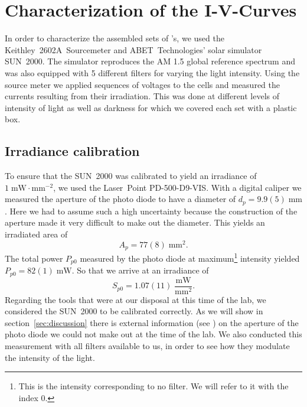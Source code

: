 
\section{Characterization of the I-V-Curves}\label{sec:charac}

In order to characterize the assembled sets of \BHSC's, we used the Keithley~2602A~Sourcemeter and ABET~Technologies’ solar simulator SUN~2000. The simulator reproduces the AM 1.5 global reference spectrum and was also equipped with 5 different filters for varying the light intensity. Using the source meter we applied sequences of voltages to the cells and measured the currents resulting from their irradiation. This was done at different levels of intensity of light as well as darkness for which we covered each set with a plastic box.
\subsection{Irradiance calibration}
To ensure that the SUN~2000 was calibrated to yield an irradiance of $1\;\text{mW}\!\cdot\text{mm}^{-2}$, we used the Laser~Point PD-500-D9-VIS. With a digital caliper we measured the aperture of the photo diode to have a diameter of $d_p = 9.9(5)\;\text{mm}$. Here we had to assume such a high uncertainty because the construction of the aperture made it very difficult to make out the diameter. This yields an irradiated area of
\begin{equation*}
A_p =  77(8)\;\text{mm}^2.
\end{equation*}
The total power $P_{p0}$ measured by the photo diode at maximum\footnote{This is the intensity corresponding to no filter. We will refer to it with the index 0.} intensity yielded $P_{p0} = 82(1)\;\text{mW}$. So that we arrive at an irradiance of
\begin{equation*}
S_{p0} = 1.07(11)\;\frac{\text{mW}}{\text{mm}^2}.
\end{equation*}
Regarding the tools that were at our disposal at this time of the lab, we considered the SUN~2000 to be calibrated correctly. As we will show in section~\ref{sec:discussion} there is external information (see \cite{photodiode}) on the aperture of the photo diode we could not make out at the time of the lab.\mypar
We also conducted this measurement with all filters available to us, in order to see how they modulate the intensity of the light.
